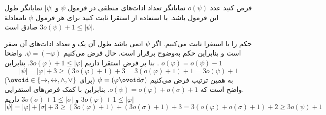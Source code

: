 فرض کنید عدد $o(\psi)$ نمایانگر تعداد ادات‌های منطقی در فرمول $\psi$ و $|\psi|$ نمایانگر طول این فرمول باشد. با استفاده از استقرا ثابت کنید برای هر فرمول $\psi$ نامعادلهٔ
$3o(\psi)+1\leq|\psi|$ صادق است.
\begin{ans}
حکم را با استقرا ثابت می‌کنیم. اگر $\psi$ اتمی باشد طول آن یک و تعداد ادات‌های آن صفر است و بنابراین حکم به‌وضوح برقرار است. حال فرض می‌کنیم
$\psi=(\neg\varphi)$.
واضحا $o(\varphi)=o(\psi)-1$ . بنا بر فرض استقرا داریم
$3o(\varphi)+1\leq|\varphi|$.
بنابراین
$$
|\psi|=|\varphi|+3\geq(3o(\varphi)+1)+3=3(o(\varphi)+1)+1=3o(\psi)+1
$$
به همین ترتیب فرض می‌کنیم
$\psi=(\varphi\ovoid\sigma)$
(برای
$\ovoid\in\{\to,\leftrightarrow,\wedge,\vee\}$)
.واضح است که $o(\psi)=o(\varphi)+o(\sigma)+1$. بنابراین با کمک فرض‌های استقرایی
$3o(\varphi)+1\leq|\varphi|$
و
$3o(\sigma)+1\leq|\sigma|$
داریم
$$|\psi|=|\varphi|+|\sigma|+3\geq(3o(\varphi)+1)+(3o(\sigma)+1)+3=3(o(\varphi)+o(\sigma)+1)+2\geq3o(\psi)+1$$
\end{ans}
